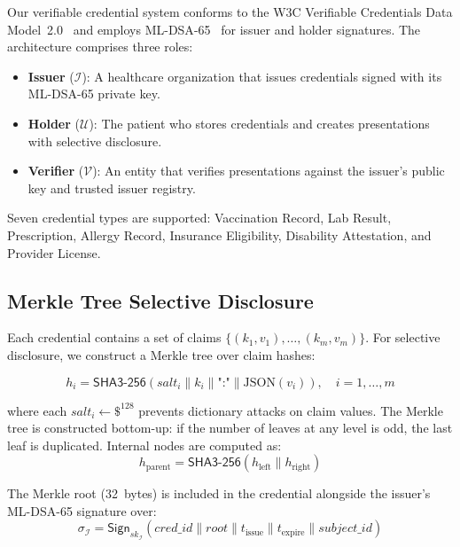 \documentclass[conference,10pt]{IEEEtran}
\newcommand{\mldsa}{\textsf{ML-DSA}}
\newcommand{\shaiii}{\textsf{SHA3-256}}
\newcommand{\Sign}{\mathsf{Sign}}
\begin{document}
Our verifiable credential system conforms to the W3C Verifiable Credentials Data Model~2.0~\cite{w3cvc} and employs \mldsa{}-65~\cite{fips204, ducas2018dilithium} for issuer and holder signatures. The architecture comprises three roles:

\begin{itemize}[leftmargin=*]
    \item \textbf{Issuer} ($\mathcal{I}$): A healthcare organization that issues credentials signed with its \mldsa{}-65 private key.
    \item \textbf{Holder} ($\mathcal{U}$): The patient who stores credentials and creates presentations with selective disclosure.
    \item \textbf{Verifier} ($\mathcal{V}$): An entity that verifies presentations against the issuer's public key and trusted issuer registry.
\end{itemize}

Seven credential types are supported: Vaccination Record, Lab Result, Prescription, Allergy Record, Insurance Eligibility, Disability Attestation, and Provider License.

\subsection{Merkle Tree Selective Disclosure}

Each credential contains a set of claims $\{(k_1, v_1), \ldots, (k_m, v_m)\}$. For selective disclosure, we construct a Merkle tree over claim hashes:

\begin{equation}
h_i = \shaiii{}(\mathit{salt}_i \| k_i \| \texttt{":"} \| \text{JSON}(v_i)), \quad i = 1, \ldots, m
\end{equation}

where each $\mathit{salt}_i \leftarrow \$^{128}$ prevents dictionary attacks on claim values. The Merkle tree is constructed bottom-up: if the number of leaves at any level is odd, the last leaf is duplicated. Internal nodes are computed as:
\begin{equation}
h_{\text{parent}} = \shaiii{}(h_{\text{left}} \| h_{\text{right}})
\end{equation}

The Merkle root (32~bytes) is included in the credential alongside the issuer's \mldsa{}-65 signature over:
\begin{equation}
\sigma_{\mathcal{I}} = \Sign_{\mathit{sk}_\mathcal{I}}\!\left(\mathit{cred\_id} \| \mathit{root} \| t_{\text{issue}} \| t_{\text{expire}} \| \mathit{subject\_id}\right)
\end{equation}
\end{document}
